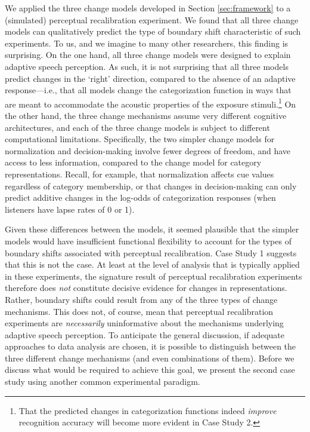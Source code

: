 \documentclass[
  11pt,
  man,floatsintext]{apa6}
\begin{document}
We applied the three change models developed in Section \ref{sec:framework} to a (simulated) perceptual recalibration experiment. We found that all three change models can qualitatively predict the type of boundary shift characteristic of such experiments. To us, and we imagine to many other researchers, this finding is surprising. On the one hand, all three change models were designed to explain adaptive speech perception. As such, it is not surprising that all three models predict changes in the `right' direction, compared to the absence of an adaptive response---i.e., that all models change the categorization function in ways that are meant to accommodate the acoustic properties of the exposure stimuli.\footnote{That the predicted changes in categorization functions indeed \emph{improve} recognition accuracy will become more evident in Case Study 2.} On the other hand, the three change mechanisms assume very different cognitive architectures, and each of the three change models is subject to different computational limitations. Specifically, the two simpler change models for normalization and decision-making involve fewer degrees of freedom, and have access to less information, compared to the change model for category representations. Recall, for example, that normalization affects cue values regardless of category membership, or that changes in decision-making can only predict additive changes in the log-odds of categorization responses (when listeners have lapse rates of 0 or 1).

Given these differences between the models, it seemed plausible that the simpler models would have insufficient functional flexibility to account for the types of boundary shifts associated with perceptual recalibration. Case Study 1 suggests that this is not the case. At least at the level of analysis that is typically applied in these experiments, the signature result of perceptual recalibration experiments therefore does \emph{not} constitute decisive evidence for changes in representations. Rather, boundary shifts could result from any of the three types of change mechanisms. This does not, of course, mean that perceptual recalibration experiments are \emph{necessarily} uninformative about the mechanisms underlying adaptive speech perception. To anticipate the general discussion, if adequate approaches to data analysis are chosen, it is possible to distinguish between the three different change mechanisms (and even combinations of them). Before we discuss what would be required to achieve this goal, we present the second case study using another common experimental paradigm.
\end{document}
